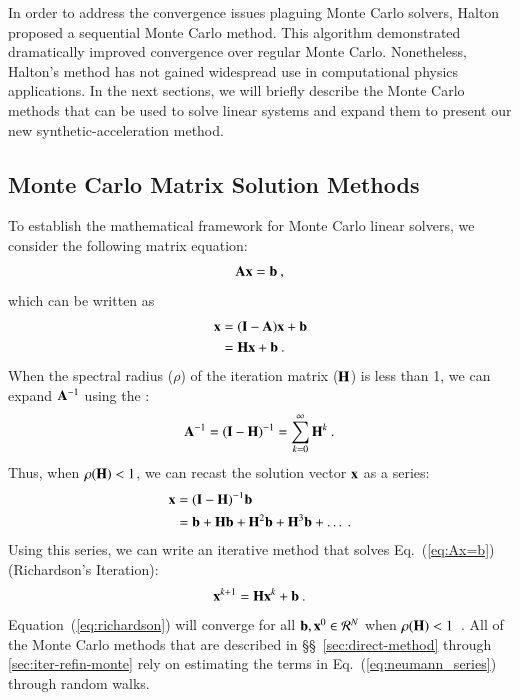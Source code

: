 \documentclass[preprint,12pt]{elsarticle}
\newcommand{\vA}{\ensuremath{\ve{A}}}
\newcommand{\vb}{\ensuremath{\ve{b}}}
\newcommand{\vx}{\ensuremath{\ve{x}}}
\newcommand{\vI}{\ensuremath{\ve{I}}}
\newcommand{\vH}{\ensuremath{\ve{H}}}
\begin{document}
In order to address the convergence issues plaguing Monte Carlo
solvers, Halton \cite{halton_1962,halton_1994} proposed a sequential
Monte Carlo method.  This algorithm demonstrated dramatically improved
convergence over regular Monte Carlo.  Nonetheless, Halton's method
has not gained widespread use in computational physics
applications. In the next sections, we will briefly describe the Monte
Carlo methods that can be used to solve linear systems and expand them
to present our new synthetic-acceleration method.

\subsection{Monte Carlo Matrix Solution Methods}
\label{sec:background}

To establish the mathematical framework for Monte Carlo linear
solvers, we consider the following matrix equation:
\begin{equation}
  \vA\vx = \vb\:,
  \label{eq:Ax=b}
\end{equation}
which can be written as
\begin{equation}
  \begin{split}
    \vx &= (\vI - \vA)\vx + \vb\\ &= \vH\vx + \vb\:.
  \end{split}
  \label{eq:point_iteration}
\end{equation}
When the spectral radius ($\rho$) of the iteration matrix ($\vH$) is
less than 1, we can expand $\vA^{-1}$ using the :
\begin{equation}
  \vA^{-1} = (\vI - \vH)^{-1} = \sum_{k=0}^{\infty} \vH^k\:.
\end{equation}
Thus, when $\rho(\vH) < 1$, we can recast the solution vector $\vx$ as
a series:
\begin{equation}
  \begin{split}
    \vx &= (\vI - \vH)^{-1}\vb\\ &= \vb + \vH\vb + \vH^2\vb + \vH^3\vb
    + \ldots\:.
    \label{eq:neumann_series}
  \end{split}
\end{equation}
Using this series, we can write an iterative method that solves
Eq.~(\ref{eq:Ax=b}) (Richardson's Iteration):
\begin{equation}
  \vx^{k+1} = \vH\vx^k + \vb\:.
  \label{eq:richardson}
\end{equation}
Equation~(\ref{eq:richardson}) will converge for all $\vb,\vx^0 \in
\mathcal{R}^{N}$ when $\rho(\vH) < 1$~\cite{kelley_1995}.  All of the Monte
Carlo methods that are described in \S\S~\ref{sec:direct-method} through
\ref{sec:iter-refin-monte} rely on estimating the terms in
Eq.~(\ref{eq:neumann_series}) through random walks.
\end{document}
